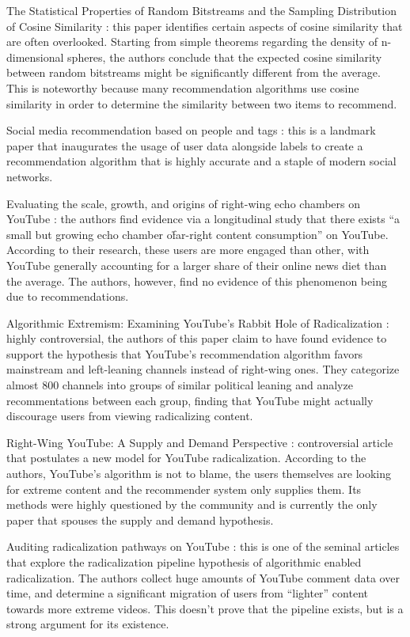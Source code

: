 The Statistical Properties of Random Bitstreams and the Sampling Distribution of
Cosine Similarity \citet{giller_statistical_2012}: this paper identifies certain
aspects of cosine similarity that are often overlooked. Starting from simple
theorems regarding the density of n-dimensional spheres, the authors conclude
that the expected cosine similarity between random bitstreams might be
significantly different from the average. This is noteworthy because many
recommendation algorithms use cosine similarity in order to determine the
similarity between two items to recommend.

Social media recommendation based on people and tags \citet{guy_social_2010}:
this is a landmark paper that inaugurates the usage of user data alongside
labels to create a recommendation algorithm that is highly accurate and a staple
of modern social networks.

Evaluating the scale, growth, and origins of right-wing echo chambers on YouTube
\citet{hosseinmardi_evaluating_2020}: the authors find evidence via a
longitudinal study that there exists ``a small but growing echo chamber o\r
far-right content consumption'' on YouTube. According to their research, these
users are more engaged than other, with YouTube generally accounting for a
larger share of their online news diet than the average. The authors, however,
find no evidence of this phenomenon being due to recommendations.

Algorithmic Extremism: Examining YouTube's Rabbit Hole of Radicalization
\citet{ledwich_algorithmic_2019}: highly controversial, the authors of this
paper claim to have found evidence to support the hypothesis that YouTube's
recommendation algorithm favors mainstream and left-leaning channels instead of
right-wing ones. They categorize almost 800 channels into groups of similar
political leaning and analyze recommentations between each group, finding that
YouTube might actually discourage users from viewing radicalizing content.

Right-Wing YouTube: A Supply and Demand Perspective
\citet{munger_right-wing_2020}: controversial article that postulates a new
model for YouTube radicalization. According to the authors, YouTube's algorithm
is not to blame, the users themselves are looking for extreme content and the
recommender system only supplies them. Its methods were highly questioned by the
community and is currently the only paper that spouses the supply and demand
hypothesis.

Auditing radicalization pathways on YouTube \citet{ribeiro_auditing_2020}: this
is one of the seminal articles that explore the radicalization pipeline
hypothesis of algorithmic enabled radicalization. The authors collect huge
amounts of YouTube comment data over time, and determine a significant migration
of users from ``lighter'' content towards more extreme videos. This doesn't
prove that the pipeline exists, but is a strong argument for its existence.

